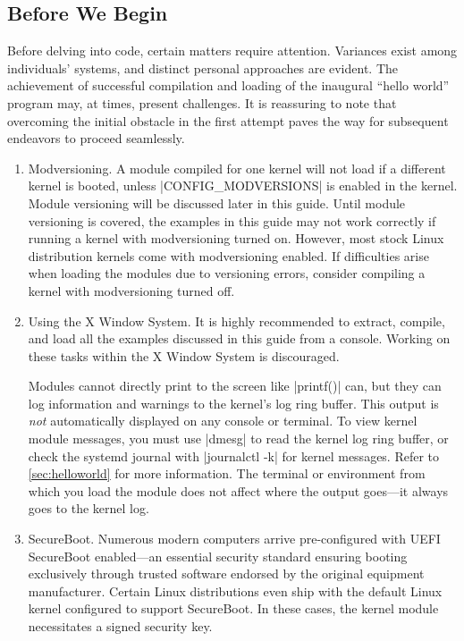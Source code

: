 \documentclass[10pt, oneside]{book}
\begin{document}
\subsection{Before We Begin}
\label{sec:preparation}
Before delving into code, certain matters require attention.
Variances exist among individuals' systems, and distinct personal approaches are evident.
The achievement of successful compilation and loading of the inaugural ``hello world'' program may,
at times, present challenges.
It is reassuring to note that overcoming the initial obstacle in the first attempt paves the way for subsequent endeavors to proceed seamlessly.

\begin{enumerate}
  \item Modversioning.
        A module compiled for one kernel will not load if a different kernel is booted,
        unless \cpp|CONFIG_MODVERSIONS| is enabled in the kernel.
        Module versioning will be discussed later in this guide.
        Until module versioning is covered, the examples in this guide may not work correctly if running a kernel with modversioning turned on.
        However, most stock Linux distribution kernels come with modversioning enabled.
        If difficulties arise when loading the modules due to versioning errors, consider compiling a kernel with modversioning turned off.

  \item Using the X Window System.
        It is highly recommended to extract, compile, and load all the examples discussed in this guide from a console.
        Working on these tasks within the X Window System is discouraged.

        Modules cannot directly print to the screen like \cpp|printf()| can,
        but they can log information and warnings to the kernel's log ring buffer.
        This output is \emph{not} automatically displayed on any console or terminal.
        To view kernel module messages, you must use \sh|dmesg| to read the kernel log ring buffer,
        or check the systemd journal with \sh|journalctl -k| for kernel messages.
        Refer to \ref{sec:helloworld} for more information.
        The terminal or environment from which you load the module does not affect where the output goes—it always goes to the kernel log.
  \item SecureBoot.
        Numerous modern computers arrive pre-configured with UEFI SecureBoot enabled—an essential security standard ensuring booting exclusively through trusted software endorsed by the original equipment manufacturer.
        Certain Linux distributions even ship with the default Linux kernel configured to support SecureBoot.
        In these cases, the kernel module necessitates a signed security key.


\end{enumerate}
\end{document}
